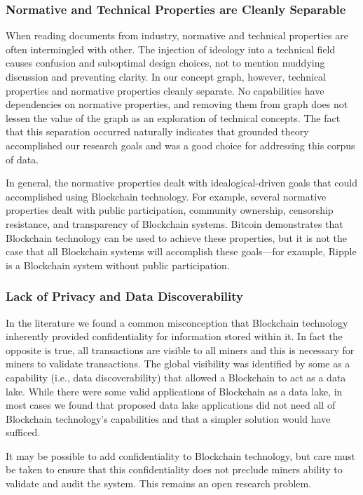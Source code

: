 \subsubsection{Normative and Technical Properties are Cleanly Separable}
When reading documents from industry, normative and technical properties are often intermingled with other.
The injection of ideology into a technical field causes confusion and suboptimal design choices, not to mention muddying discussion and preventing clarity.
In our concept graph, however, technical properties and normative properties cleanly separate.
No capabilities have dependencies on normative properties, and removing them from graph does not lessen the value of the graph as an exploration of technical concepts. 
The fact that this separation occurred naturally indicates that grounded theory accomplished our research goals and was a good choice for addressing this corpus of data.

In general, the normative properties dealt with idealogical-driven goals that could accomplished using Blockchain technology.
For example, several normative properties dealt with public participation, community ownership, censorship resistance, and transparency of Blockchain systems.
Bitcoin demonstrates that Blockchain technology can be used to achieve these properties, but it is not the case that all Blockchain systems will accomplish these goals---for example, Ripple is a Blockchain system without public participation.

\subsubsection{Lack of Privacy and Data Discoverability}
In the literature we found a common misconception that Blockchain technology inherently provided confidentiality for information stored within it.
In fact the opposite is true, all transactions are visible to all miners and this is necessary for miners to validate transactions.
The global visibility was identified by some as a capability (i.e., data discoverability) that allowed a Blockchain to act as a data lake.
While there were some valid applications of Blockchain as a data lake, in most cases we found that proposed data lake applications did not need all of Blockchain technology's capabilities and that a simpler solution would have sufficed.

It may be possible to add confidentiality to Blockchain technology, but care must be taken to ensure that this confidentiality does not preclude miners ability to validate and audit the system.
This remains an open research problem.

